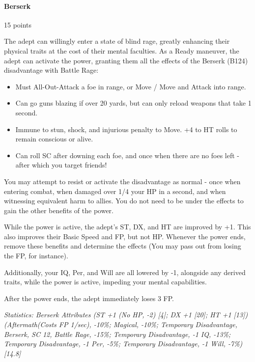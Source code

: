 \begin{multicols}{3}
	
	\paragraph{Berserk}
	\begin{flushright}
		15 points
	\end{flushright}

	The adept can willingly enter a state of blind rage, greatly enhancing their physical traits at the cost of their mental faculties. As a Ready maneuver, the adept can activate the power, granting them all the effects of the Berserk (B124) disadvantage with Battle Rage:
	
	\begin{itemize}
		\itemsep 0pt
		\item Must All-Out-Attack a foe in range, or Move / Move and Attack into range.
		\item Can go guns blazing if over 20 yards, but can only reload weapons that take 1 second.
		\item Immune to stun, shock, and injurious penalty to Move. +4 to HT rolls to remain conscious or alive.
		\item Can roll SC after downing each foe, and once when there are no foes left - after which you target friends!
	\end{itemize}	

	You may attempt to resist or activate the disadvantage as normal - once when entering combat, when damaged over 1/4 your HP in a second, and when witnessing equivalent harm to allies. You do not need to be under the effects to gain the other benefits of the power.

	While the power is active, the adept's ST, DX, and HT are improved by +1. This also improves their Basic Speed and FP, but not HP. Whenever the power ends, remove these benefits and determine the effects (You may pass out from losing the FP, for instance).
	
	Additionally, your IQ, Per, and Will are all lowered by -1, alongside any derived traits, while the power is active, impeding your mental capabilities.
	
	After the power ends, the adept immediately loses 3 FP.
	
	\textcolor{OliveGreen}{\textit{Statistics: Berserk Attributes (ST +1 (No HP, -2) [4]; DX +1 [20]; HT +1 [13]) (Aftermath(Costs FP 1/sec), -10\%; Magical, -10\%; Temporary Disadvantage, Berserk, SC 12, Battle Rage, -15\%; Temporary Disadvantage, -1 IQ, -13\%; Temporary Disadvantage, -1 Per, -5\%; Temporary Disadvantage, -1 Will, -7\%) [14.8] }}
			

\end{multicols}
